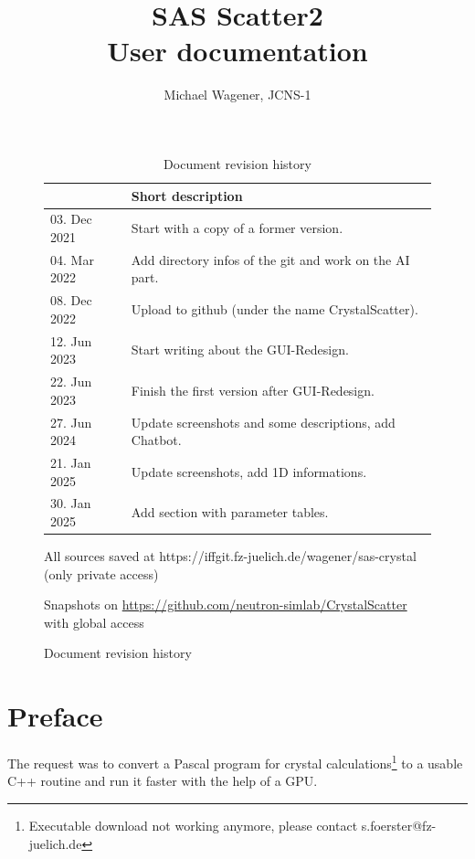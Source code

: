 \documentclass[11pt]{article} %
\author{Michael Wagener, JCNS-1}
\title{SAS Scatter2 \\[1ex] {\large User documentation}}
\begin{document}
\maketitle
\tableofcontents %

\clearpage
\begin{figure}  %
\begin{longtable}{|p{3cm}|p{12cm}|}
\caption{Document revision history} \\
\hline
\rowcolor{rowcolor}{\bf Date} & {\bf Short description} \\
\endfirsthead
\hline
03. Dec 2021 & Start with a copy of a former version. \\ \hline
04. Mar 2022 & Add directory infos of the git and work on the AI part. \\ \hline
08. Dec 2022 & Upload to github (under the name CrystalScatter). \\ \hline
12. Jun 2023 & Start writing about the GUI-Redesign. \\ \hline
22. Jun 2023 & Finish the first version after GUI-Redesign. \\ \hline
27. Jun 2024 & Update screenshots and some descriptions, add Chatbot. \\ \hline
21. Jan 2025 & Update screenshots, add 1D informations. \\ \hline
30. Jan 2025 & Add section with parameter tables. \\ \hline
\end{longtable}

\centerline{All sources saved at https://iffgit.fz-juelich.de/wagener/sas-crystal (only private access)}
\centerline{Snapshots on \url{https://github.com/neutron-simlab/CrystalScatter} with global access}
\end{figure}

\clearpage %


\section{Preface}

The request was to convert a Pascal program for crystal calculations\footnote{Executable download not working anymore, please contact s.foerster@fz-juelich.de}
to a usable C++ routine and run it faster with the help of a GPU.
\end{document}
